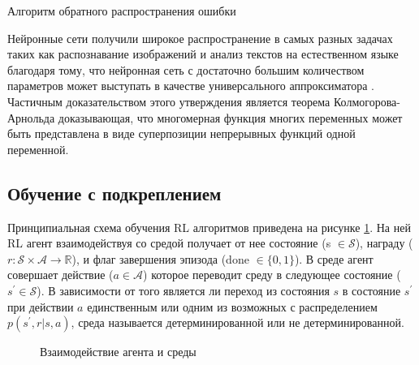 \begin{algorithm}[ht]
	\SetAlgoLined
	\caption{Алгоритм обратного распространения ошибки}
	\label{alg:backprop}

\end{algorithm}

Нейронные сети получили широкое распространение в самых разных задачах таких как распознавание изображений \cite{alexnet} и анализ текстов на естественном языке \cite{bert} благодаря тому, что нейронная сеть с достаточно большим количеством параметров может выступать в качестве универсального аппроксиматора \cite{Hornik1989}. Частичным доказательством этого утверждения является теорема Колмогорова-Арнольда\cite{kolmogorov, arnold} доказывающая, что многомерная функция многих переменных может быть представлена в виде суперпозиции непрерывных функций одной переменной. 

\subsection{Обучение с подкреплением}

Принципиальная схема обучения RL алгоритмов приведена на рисунке \ref{fig:rl}. На ней RL агент взаимодействуя со средой получает от нее состояние (s $\in \mathcal{S}$), награду ($r: \mathcal{S} \times \mathcal{A} \to \mathbb{R}$), и флаг завершения эпизода (done $\in \{0, 1\}$).  В среде агент совершает действие ($a \in \mathcal{A}$) которое переводит среду в следующее состояние ($s^{\prime} \in \mathcal{S}$). В зависимости от того является ли переход из состояния $s$ в состояние $s^{\prime}$ при действии $a$ единственным или одним из возможных с распределением $p(s^{\prime},r|s,a)$, среда называется детерминированной или не детерминированной. 

\begin{figure}[ht]
	\caption{Взаимодействие агента и среды}
	\label{fig:rl}
\end{figure}

